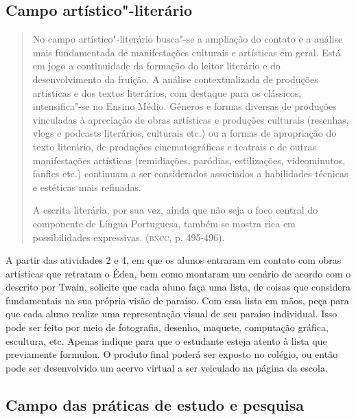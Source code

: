 \documentclass[12pt]{extarticle}
\begin{document}
\subsection{Campo artístico"-literário}

\begin{quote}
No campo artístico"-literário busca"-se a ampliação do contato e a
análise mais fundamentada de manifestações culturais e artísticas em
geral. Está em jogo a continuidade da formação do leitor literário e do
desenvolvimento da fruição. A análise contextualizada de produções
artísticas e dos textos literários, com destaque para os clássicos,
intensifica"-se no Ensino Médio. Gêneros e formas diversas de produções
vinculadas à apreciação de obras artísticas e produções culturais
(resenhas, vlogs e podcasts literários, culturais etc.) ou a formas de
apropriação do texto literário, de produções cinematográficas e teatrais
e de outras manifestações artísticas (remidiações, paródias,
estilizações, videominutos, fanfics etc.) continuam a ser considerados
associados a habilidades técnicas e estéticas mais refinadas.

A escrita literária, por sua vez, ainda que não seja o foco central do
componente de Língua Portuguesa, também se mostra rica em possibilidades
expressivas. (\textsc{bncc}, p. 495-496).
\end{quote}

A partir das atividades 2 e 4, em que os alunos entraram em contato
com obras artísticas que retratam o Éden, bem como montaram um cenário
de acordo com o descrito por Twain, solicite que cada aluno faça uma
lista, de coisas que considera fundamentais na sua própria visão de
paraíso. Com essa lista em mãos, peça para que cada aluno realize uma
representação visual de seu paraíso individual. Isso pode ser feito
por meio de fotografia, desenho, maquete, computação gráfica,
escultura, etc. Apenas indique para que o estudante esteja atento à
lista que previamente formulou. O produto final poderá ser exposto no
colégio, ou então pode ser desenvolvido um acervo virtual a ser
veiculado na página da escola.

\subsection{Campo das práticas de estudo e pesquisa}
\end{document}
